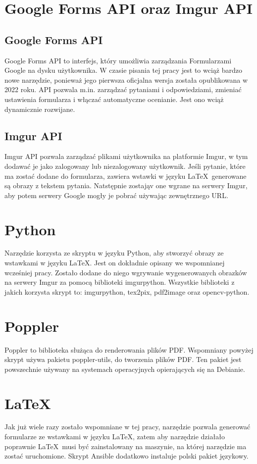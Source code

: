 \section{Google Forms API oraz Imgur API}

\subsection*{Google Forms API}
Google Forms API to interfejs, który umożliwia zarządzania Formularzami Google na dysku
użytkownika. W czasie pisania tej pracy jest to wciąż bardzo nowe narzędzie, ponieważ
jego pierwsza oficjalna wersja została opublikowana w 2022 roku. API pozwala m.in. zarządzać
pytaniami i odpowiedziami, zmieniać ustawienia formularza i włączać automatyczne ocenianie.
Jest ono wciąż dynamicznie rozwijane.

\subsection*{Imgur API}
Imgur API pozwala zarządzać plikami użytkownika na platformie Imgur, w tym dodawać je jako
zalogowany lub niezalogowany użytkownik. Jeśli pytanie, które ma zostać dodane do formularza, 
zawiera wstawki w języku \LaTeX\, generowane są obrazy z tekstem pytania. Natstępnie 
zostająv one wgrane na serwery Imgur, aby potem serwery Google
mogły je pobrać używając zewnętrznego URL.

\section{Python}
Narzędzie korzysta ze skryptu w języku Python, aby stworzyć obrazy ze wstawkami w języku \LaTeX.
Jest on dokładnie opisany we wspomnianej wcześniej pracy. Zostało dodane do niego wgrywanie 
wygenerowanych obrazków na serwery Imgur za pomocą biblioteki imgurpython.
Wszystkie biblioteki z jakich korzysta skrypt to: imgurpython, tex2pix, pdf2image oraz
opencv-python.

\section{Poppler}
Poppler to biblioteka służąca do renderowania plików PDF. Wspomniany powyżej skrypt
używa pakietu poppler-utils, do tworzenia plików PDF. Ten pakiet jest powszechnie
używany na systemach operacyjnych opierających się na Debianie.

\section{LaTeX}
Jak już wiele razy zostało wspomniane w tej pracy, narzędzie pozwala generować formularze ze 
wstawkami
w języku \LaTeX, zatem aby narzędzie działało poprawnie \LaTeX\ musi być zainstalowany 
na maszynie, na której narzędzie ma zostać uruchomione. Skrypt Ansible dodatkowo instaluje
polski pakiet językowy.
